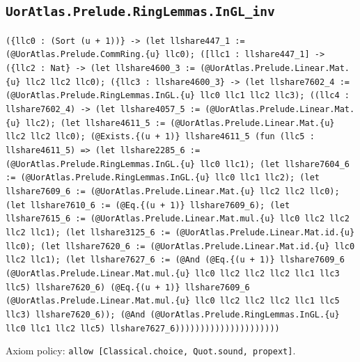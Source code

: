 \documentclass[11pt]{article}
\begin{document}
\subsection*{\texttt{UorAtlas.Prelude.RingLemmas.InGL\_inv}}
\noindent\texttt{(\{llc0 : (Sort (u + 1))\} -> (let llshare447\_1 := (@UorAtlas.Prelude.CommRing.\{u\} llc0); ([llc1 : llshare447\_1] -> (\{llc2 : Nat\} -> (let llshare4600\_3 := (@UorAtlas.Prelude.Linear.Mat.\{u\} llc2 llc2 llc0); (\{llc3 : llshare4600\_3\} -> (let llshare7602\_4 := (@UorAtlas.Prelude.RingLemmas.InGL.\{u\} llc0 llc1 llc2 llc3); ((llc4 : llshare7602\_4) -> (let llshare4057\_5 := (@UorAtlas.Prelude.Linear.Mat.\{u\} llc2); (let llshare4611\_5 := (@UorAtlas.Prelude.Linear.Mat.\{u\} llc2 llc2 llc0); (@Exists.\{(u + 1)\} llshare4611\_5 (fun (llc5 : llshare4611\_5) => (let llshare2285\_6 := (@UorAtlas.Prelude.RingLemmas.InGL.\{u\} llc0 llc1); (let llshare7604\_6 := (@UorAtlas.Prelude.RingLemmas.InGL.\{u\} llc0 llc1 llc2); (let llshare7609\_6 := (@UorAtlas.Prelude.Linear.Mat.\{u\} llc2 llc2 llc0); (let llshare7610\_6 := (@Eq.\{(u + 1)\} llshare7609\_6); (let llshare7615\_6 := (@UorAtlas.Prelude.Linear.Mat.mul.\{u\} llc0 llc2 llc2 llc2 llc1); (let llshare3125\_6 := (@UorAtlas.Prelude.Linear.Mat.id.\{u\} llc0); (let llshare7620\_6 := (@UorAtlas.Prelude.Linear.Mat.id.\{u\} llc0 llc2 llc1); (let llshare7627\_6 := (@And (@Eq.\{(u + 1)\} llshare7609\_6 (@UorAtlas.Prelude.Linear.Mat.mul.\{u\} llc0 llc2 llc2 llc2 llc1 llc3 llc5) llshare7620\_6) (@Eq.\{(u + 1)\} llshare7609\_6 (@UorAtlas.Prelude.Linear.Mat.mul.\{u\} llc0 llc2 llc2 llc2 llc1 llc5 llc3) llshare7620\_6)); (@And (@UorAtlas.Prelude.RingLemmas.InGL.\{u\} llc0 llc1 llc2 llc5) llshare7627\_6)))))))))))))))))))))}\par
\noindent Axiom policy: \texttt{allow [Classical.choice, Quot.sound, propext]}.\par
\end{document}

